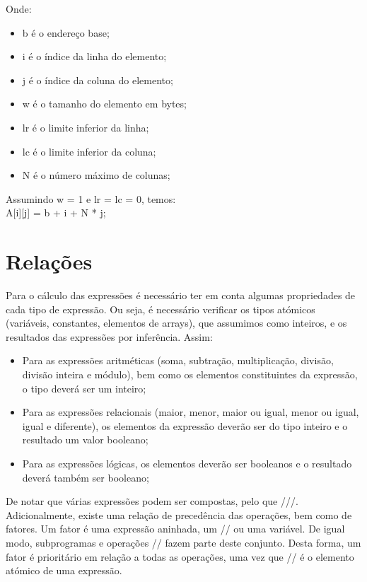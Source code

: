Onde:

\begin{itemize}
\item b é o endereço base;
\item i é o índice da linha do elemento;
\item j é o índice da coluna do elemento;
\item w é o tamanho do elemento em bytes;
\item lr é o limite inferior da linha;
\item lc é o limite inferior da coluna;
\item N é o número máximo de colunas;
\end{itemize}

Assumindo w = 1 e lr = lc = 0, temos:\\

A[i][j] = b + i + N * j;\\


\section{Relações}
\label{sec:relacoes:analise}

Para o cálculo das expressões é necessário ter em conta algumas propriedades de cada tipo de expressão. Ou seja, é necessário verificar os tipos atómicos (variáveis, constantes, elementos de arrays), que assumimos como inteiros, e os resultados das expressões por inferência. Assim:\\
\begin{itemize}
\item Para as expressões aritméticas (soma, subtração, multiplicação, divisão, divisão inteira e módulo), bem como os elementos constituintes da expressão, o tipo deverá ser um inteiro;
\item Para as expressões relacionais (maior, menor, maior ou igual, menor ou igual, igual e diferente), os elementos da expressão deverão ser do tipo inteiro e o resultado um valor booleano;
\item Para as expressões lógicas, os elementos deverão ser booleanos e o resultado deverá também ser booleano;
\end{itemize}

De notar que várias expressões podem ser compostas, pelo que ///. Adicionalmente, existe uma relação de precedência das operações, bem como de fatores. Um fator é uma expressão aninhada, um // ou uma variável. De igual modo, subprogramas e operações // fazem parte deste conjunto. Desta forma, um fator é prioritário em relação a todas as operações, uma vez que // é o elemento atómico de uma expressão.\\

